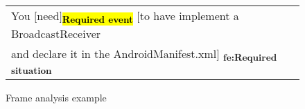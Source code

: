 \vspace{-0.1in}
\begin{figure}[h]
\begin{footnotesize}
\begingroup
\setlength{\tabcolsep}{10pt} %
\renewcommand{\arraystretch}{2} %
\begin{tabular}{|l|}
    
    \hline

    

    
    
    You  $\big[$need$\big]$\textsubscript{\ttfamily \hl{\textbf{Required event}}}  $\big[$to have implement a BroadcastReceiver \\

    and declare it in the AndroidManifest.xml$\big]$\textsubscript{\ttfamily  \color{rufous} \textbf{fe:Required situation}}  \\

    \hline
\end{tabular}
\endgroup
\end{footnotesize}
\caption{Frame analysis example}
\label{fig:frame-example}
\end{figure}
